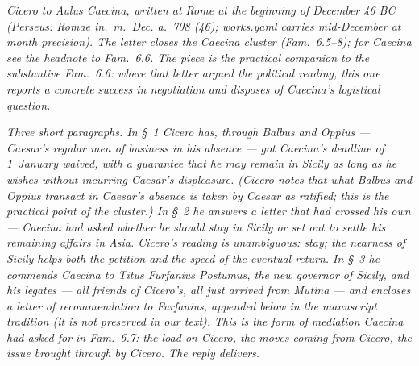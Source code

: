 
\textit{Cicero to Aulus Caecina, written at Rome at the
beginning of December 46 BC (Perseus: \textit{Romae in.~m.~Dec.
a.~708 (46)}; works.yaml carries mid-December at month
precision). The letter closes the Caecina cluster
(\textit{Fam.}~6.5--8); for Caecina see the headnote to
\textit{Fam.}~6.6. The piece is the practical companion to the
substantive \textit{Fam.}~6.6: where that letter argued the
political reading, this one reports a concrete success in
negotiation and disposes of Caecina's logistical question.}

\textit{Three short paragraphs. In \S~1 Cicero has, through
Balbus and Oppius --- Caesar's regular men of business in his
absence --- got Caecina's deadline of 1~January waived, with a
guarantee that he may remain in Sicily as long as he wishes
without incurring Caesar's displeasure. (Cicero notes that what
Balbus and Oppius transact in Caesar's absence is taken by
Caesar as ratified; this is the practical point of the cluster.)
In \S~2 he answers a letter that had crossed his own --- Caecina
had asked whether he should stay in Sicily or set out to settle
his remaining affairs in Asia. Cicero's reading is unambiguous:
stay; the nearness of Sicily helps both the petition and the
speed of the eventual return. In \S~3 he commends Caecina to
Titus Furfanius Postumus, the new governor of Sicily, and his
legates --- all friends of Cicero's, all just arrived from
Mutina --- and encloses a letter of recommendation to Furfanius,
appended below in the manuscript tradition (it is not preserved
in our text). This is the form of mediation Caecina had asked
for in \textit{Fam.}~6.7: the load on Cicero, the moves coming
from Cicero, the issue brought through by Cicero. The reply
delivers.}

